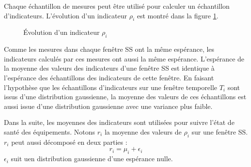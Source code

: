 \documentclass{article}
\begin{document}
Chaque échantillon de mesures peut être utilisé pour calculer un échantillon d'indicateurs.
L'évolution d'un indicateur $\rho_i$ est montré dans la figure \ref{fig:exampleindicator}.

\begin{figure}[H]
\centering
{}
\caption{Évolution d'un indicateur $\rho_i$}
\label{fig:exampleindicator}
\end{figure}

Comme les mesures dans chaque fenêtre SS ont la même espérance, les indicateurs calculés par ces mesures ont aussi la même espérance.
L'espérance de la moyenne des valeurs des indicateurs d'une fenêtre SS est identique à l'espérance des échantillons des indicateurs de cette fenêtre. 
En faisant l'hypothèse que les échantillons d'indicateurs sur une fenêtre temporelle $T_i$  sont issus d'une distribution gaussienne, la moyenne des valeurs de ces échantillons est aussi issue d'une distribution gaussienne avec une variance plus faible.
 
Dans la suite, les moyennes des indicateurs sont utilisées pour suivre l'état de santé des équipements. 
Notons $r_i$ la moyenne des valeurs de $\rho_i$ sur une fenêtre SS.
$r_i$ peut aussi décomposé en deux parties : 
\begin{equation}
    r_i  = \mu_i + \epsilon_i
\end{equation}
$\epsilon_i$ suit uen distribution gaussienne d'une espérance nulle.
\end{document}
